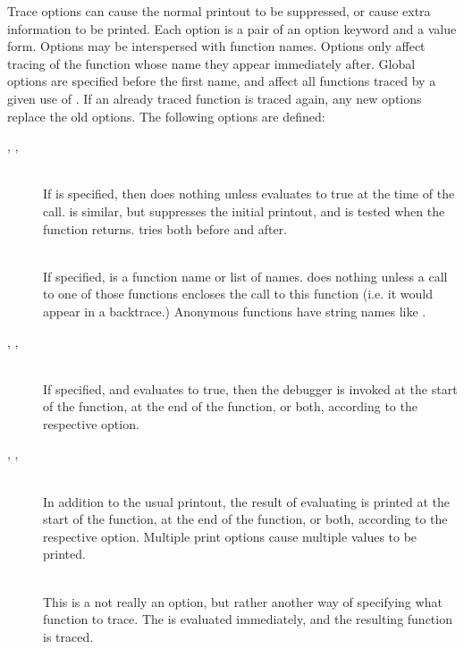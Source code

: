 Trace options can cause the normal printout to be suppressed, or cause
extra information to be printed.  Each option is a pair of an option
keyword and a value form.  Options may be interspersed with function
names.  Options only affect tracing of the function whose name they
appear immediately after.  Global options are specified before the first
name, and affect all functions traced by a given use of .
If an already traced function is traced again, any new options replace the
old options.  The following options are defined:
\begin{description}
\item[ , 
 , 
 ]\hfill\\
If  is specified, then  does nothing unless
 evaluates to true at the time of the call.  
is similar, but suppresses the initial printout, and is tested when the
function returns.   tries both before and after.

\item[ ]\hfill\\
If specified,  is a function name or list of names.  
does nothing unless a call to one of those functions encloses the call
to this function (i.e. it would appear in a backtrace.)  Anonymous
functions have string names like .

\item[ , 
 , 
 ]\hfill\\
If specified, and  evaluates to true, then the debugger is
invoked at the start of the function, at the end of the function, or
both, according to the respective option.

\item[ , 
 ,
 ]\hfill\\
In addition to the usual printout, the result of evaluating  is
printed at the start of the function, at the end of the function, or
both, according to the respective option.  Multiple print options cause
multiple values to be printed.

\item[ ]\hfill\\
This is a not really an option, but rather another way of specifying
what function to trace.  The  is evaluated immediately,
and the resulting function is traced.


\end{description}

